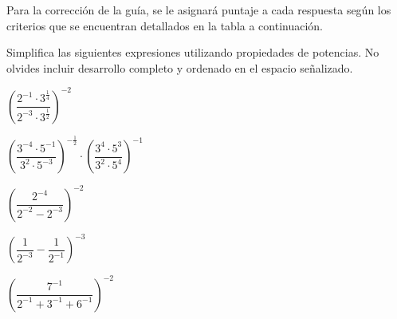 \documentclass{prueba}
\begin{document}

Para la corrección de la guía, se le asignará puntaje a cada respuesta según los criterios
que se encuentran detallados en la tabla a continuación.

\pauta
\newpage

\parte{} Simplifica las siguientes expresiones utilizando propiedades de potencias. 
No olvides incluir desarrollo completo y ordenado en el espacio señalizado. 

\pregunta{} $\left(\dfrac{2^{-1}\cdot 3^{\frac{1}{4}}}{2^{-3}\cdot 3^{\frac{1}{2}}}\right)^{-2}$
\desarrollo[5cm]

\pregunta{} $\left(\dfrac{3^{-4}\cdot 5^{-1}}{3^2\cdot 5^{-3}}\right)^{-\frac{1}{2}}\cdot\left(\dfrac{3^4\cdot 5^3}{3^2\cdot 5^4}\right)^{-1}$
\desarrollo[6cm]

\pregunta{} $\left(\dfrac{2^{-4}}{2^{-2}-2^{-3}}\right)^{-2}$
\desarrollo[6cm]

\pregunta{} $\left(\dfrac{1}{2^{-3}} - \dfrac{1}{2^{-1}}\right)^{-3}$
\desarrollo[6cm]

\pregunta{} $\left(\dfrac{7^{-1}}{2^{-1}+3^{-1}+6^{-1}}\right)^{-2}$
\desarrollo[7cm]
\end{document}
